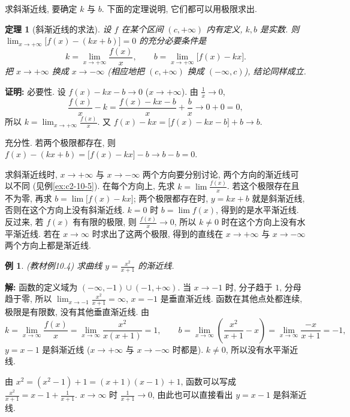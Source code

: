 \documentclass[UTF8,openany]{ctexbook}
\theoremstyle{chinesetextbook}
\newtheorem{example}{例}[section]
\newtheorem{theorem}{定理}[section]
\newenvironment{cnproof}{\par\indent\textbf{证明:} \ignorespaces}{\par}
\newenvironment{cnsolution}{\par\indent\textbf{解:} \ignorespaces}{\par}
\begin{document}
求斜渐近线, 要确定 $k$ 与 $b$. 下面的定理说明, 它们都可以用极限求出.
\begin{theorem}[斜渐近线的求法]\label{thm:c2-10-slant}
设 $f$ 在某个区间 $(c,+\infty)$ 内有定义, $k,b$ 是实数. 则 $\displaystyle\lim_{x\to+\infty}\bigl[f(x)-(kx+b)\bigr]=0$ 的充分必要条件是
\[
k=\lim_{x\to+\infty}\frac{f(x)}x,\qquad b=\lim_{x\to+\infty}\bigl[f(x)-kx\bigr].
\]
把 $x\to+\infty$ 换成 $x\to-\infty$ (相应地把 $(c,+\infty)$ 换成 $(-\infty,c)$), 结论同样成立.
\end{theorem}
\begin{cnproof}
必要性. 设 $f(x)-kx-b\to0$ ($x\to+\infty$). 由 $\displaystyle\frac1x\to0$,
\[
\frac{f(x)}x-k=\frac{f(x)-kx-b}x+\frac bx\to0+0=0,
\]
所以 $\displaystyle k=\lim_{x\to+\infty}\frac{f(x)}x$. 又 $f(x)-kx=\bigl[f(x)-kx-b\bigr]+b\to b$.

充分性. 若两个极限都存在, 则 $f(x)-(kx+b)=\bigl[f(x)-kx\bigr]-b\to b-b=0$.
\end{cnproof}
求斜渐近线时, $x\to+\infty$ 与 $x\to-\infty$ 两个方向要分别讨论, 两个方向的渐近线可以不同 (见例\ref{ex:c2-10-5}). 在每个方向上, 先求 $\displaystyle k=\lim\frac{f(x)}x$. 若这个极限存在且不为零, 再求 $\displaystyle b=\lim\bigl[f(x)-kx\bigr]$; 两个极限都存在时, $y=kx+b$ 就是斜渐近线, 否则在这个方向上没有斜渐近线. $k=0$ 时 $\displaystyle b=\lim f(x)$, 得到的是水平渐近线. 反过来, 若 $f(x)$ 有有限的极限, 则 $\displaystyle\frac{f(x)}x\to0$, 所以 $k\ne0$ 时在这个方向上没有水平渐近线. 若在 $x\to\infty$ 时求出了这两个极限, 得到的直线在 $x\to+\infty$ 与 $x\to-\infty$ 两个方向上都是渐近线.
\begin{example}\label{ex:c2-10-4}
\textnormal{(教材例10.4)} 求曲线 $\displaystyle y=\frac{x^2}{x+1}$ 的渐近线.
\end{example}
\begin{cnsolution}
函数的定义域为 $(-\infty,-1)\cup(-1,+\infty)$. 当 $x\to-1$ 时, 分子趋于 $1$, 分母趋于零, 所以 $\displaystyle\lim_{x\to-1}\frac{x^2}{x+1}=\infty$, $x=-1$ 是垂直渐近线. 函数在其他点处都连续, 极限是有限数, 没有其他垂直渐近线. 由
\[
k=\lim_{x\to\infty}\frac{f(x)}x=\lim_{x\to\infty}\frac{x^2}{x(x+1)}=1,\qquad b=\lim_{x\to\infty}\left(\frac{x^2}{x+1}-x\right)=\lim_{x\to\infty}\frac{-x}{x+1}=-1,
\]
$y=x-1$ 是斜渐近线 ($x\to+\infty$ 与 $x\to-\infty$ 时都是). $k\ne0$, 所以没有水平渐近线.

由 $x^2=(x^2-1)+1=(x+1)(x-1)+1$, 函数可以写成 $\displaystyle\frac{x^2}{x+1}=x-1+\frac1{x+1}$. $x\to\infty$ 时 $\displaystyle\frac1{x+1}\to0$, 由此也可以直接看出 $y=x-1$ 是斜渐近线.
\end{cnsolution}
\end{document}
